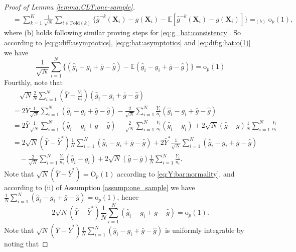 \documentclass[12pt,letterpaper]{article}
\begin{document}
\begin{proof}[Proof of Lemma \ref{lemma:CLT:one-sample}]
\begin{equation}
\begin{array}{rl}
&\displaystyle=\sum_{k=1}^K\frac{1}{\sqrt{N}}\sum_{i\in\textrm{Fold}(k)}\{\hat{g}^{-k}(\mathbf{X}_i)-g(\mathbf{X}_i)-\mathbb{E}[\hat{g}^{-k}(\mathbf{X}_i)-g(\mathbf{X}_i)]\}=_{(b)}\mathrm{o}_p(1),
\end{array}
\end{equation}
where (b) holds following similar proving steps for \eqref{eq:g_hat:consistency}. So according to \eqref{eq:g:diff:asymptotics}, \eqref{eq:g:hat:asymptotics} and \eqref{eq:dif:g:hat:o(1)} we have 
\begin{equation}\label{eq:g:bar:normality}
    \frac{1}{\sqrt{N}}\sum_{i=1}^N\{(\hat{g}_i-g_i+\bar{g}-\hat{g})-\mathbb{E}(\hat{g}_i-g_i+\bar{g}-\hat{g})\}=\mathrm{o}_p(1)
\end{equation}
Fourthly, note that 
\begin{equation}\label{eq:Y:g:consistency}
\begin{array}{rl}
&\quad\displaystyle\sqrt{N}\frac{2}{N}\sum_{i=1}^N\left(\bar{Y}-\frac{Y_i}{n_i}\right)(\hat{g}_i-g_i+\bar{g}-\hat{g})\\
&\displaystyle=2\bar{Y}\frac{1}{\sqrt{N}}\sum_{i=1}^N(\hat{g}_i-g_i+\bar{g}-\hat{g})-\frac{2}{\sqrt{N}}\sum_{i=1}^N\frac{Y_i}{n_i}(\hat{g}_i-g_i+\bar{g}-\hat{g})\\
&\displaystyle=2\bar{Y}\frac{1}{\sqrt{N}}\sum_{i=1}^N(\hat{g}_i-g_i+\bar{g}-\hat{g})-\frac{2}{\sqrt{N}}\sum_{i=1}^N\frac{Y_i}{n_i}(\hat{g}_i-g_i)+2\sqrt{N}(\hat{g}-\bar{g})\frac{1}{N}\sum_{i=1}^N\frac{Y_i}{n_i}\\
&\displaystyle=2\sqrt{N}(\bar{Y}-\bar{Y}^*)\frac{1}{N}\sum_{i=1}^N(\hat{g}_i-g_i+\bar{g}-\hat{g})+2\bar{Y}^*\frac{1}{\sqrt{N}}\sum_{i=1}^N(\hat{g}_i-g_i+\bar{g}-\hat{g})\\
&\displaystyle\quad-\frac{2}{\sqrt{N}}\sum_{i=1}^N\frac{Y_i}{n_i}(\hat{g}_i-g_i)+2\sqrt{N}(\hat{g}-\bar{g})\frac{1}{N}\sum_{i=1}^N\frac{Y_i}{n_i}.
\end{array}
\end{equation}
Note that $\sqrt{N}(\bar{Y}-\bar{Y}^*)=\mathrm{O}_p(1)$ according to \eqref{eq:Y:bar:normality}, and according to (ii) of Assumption \ref{assump:one_sample} we have $\displaystyle\frac{1}{N}\sum_{i=1}^N(\hat{g}_i-g_i+\bar{g}-\hat{g})=\mathrm{o}_p(1)$, hence 
\begin{equation}\label{eq:vanish:cross}
    2\sqrt{N}(\bar{Y}-\bar{Y}^*)\frac{1}{N}\sum_{i=1}^N(\hat{g}_i-g_i+\bar{g}-\hat{g})=\mathrm{o}_p(1).
\end{equation}
Note that $\displaystyle\sqrt{N}(\bar{Y}-\bar{Y}^*)\frac{1}{N}\sum_{i=1}^N(\hat{g}_i-g_i+\bar{g}-\hat{g})$ is uniformly integrable by noting that 

\end{proof}
\end{document}

